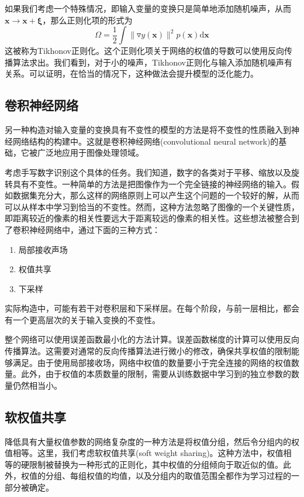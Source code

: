 如果我们考虑一个特殊情况，即输入变量的变换只是简单地添加随机噪声，从而$\boldsymbol{x}\to \boldsymbol{x}+\boldsymbol{\xi}$，那么正则化项的形式为
\begin{equation}
	\Omega=\frac{1}{2}\int \lVert \triangledown y(\boldsymbol{x})\rVert^2 p(\boldsymbol{x})\mathrm{d} \boldsymbol{x}
\end{equation}
这被称为Tikhonov正则化。这个正则化项关于网络的权值的导数可以使用反向传播算法求出。我们看到，对于小的噪声，Tikhonov正则化与输入添加随机噪声有关系。可以证明，在恰当的情况下，这种做法会提升模型的泛化能力。
\subsection*{卷积神经网络}
另一种构造对输入变量的变换具有不变性的模型的方法是将不变性的性质融入到神经网络结构的构建中。这就是卷积神经网络(convolutional neural network)的基础，它被广泛地应用于图像处理领域。

考虑手写数字识别这个具体的任务。我们知道，数字的各类对于平移、缩放以及旋转具有不变性。一种简单的方法是把图像作为一个完全链接的神经网络的输入。假如数据集充分大，那么这样的网络原则上可以产生这个问题的一个较好的解，从而可以从样本中学习到恰当的不变性。然而，这种方法忽略了图像的一个关键性质，即距离较近的像素的相关性要远大于距离较远的像素的相关性。这些想法被整合到了卷积神经网络中，通过下面的三种方式：
\begin{enumerate}[(1)]
	\item 局部接收声场
	\item 权值共享
	\item 下采样
\end{enumerate}

实际构造中，可能有若干对卷积层和下采样层。在每个阶段，与前一层相比，都会有一个更高层次的关于输入变换的不变性。

整个网络可以使用误差函数最小化的方法计算。误差函数梯度的计算可以使用反向传播算法。这需要对通常的反向传播算法进行微小的修改，确保共享权值的限制能够满足。由于使用局部接收场，网络中权值的数量要小于完全连接的网络的权值数量。此外，由于权值的本质数量的限制，需要从训练数据中学习到的独立参数的数量仍然相当小。
\subsection*{软权值共享}
降低具有大量权值参数的网络复杂度的一种方法是将权值分组，然后令分组内的权值相等。这里，我们考虑软权值共享(soft weight sharing)。这种方法中，权值相等的硬限制被替换为一种形式的正则化，其中权值的分组倾向于取近似的值。此外，权值的分组、每组权值的均值，以及分组内的取值范围全都作为学习过程的一部分被确定。

